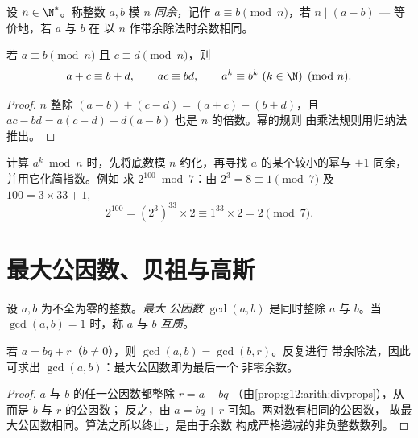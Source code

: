\begin{definition}[同余]\label{def:g12:arith:congruence}
设 $n \in \N^*$。称整数 $a, b$ 模
$n$ \emph{同余}，记作 $a \equiv b \pmod n$，若 $n \mid (a - b)$
--- 等价地，若 $a$ 与 $b$ 在
以 $n$ 作带余除法时余数相同。
\end{definition}

\begin{proposition}[运算的相容性]\label{prop:g12:arith:congops}
若 $a \equiv b \pmod n$ 且 $c \equiv d \pmod n$，则
\[
a + c \equiv b + d, \qquad
ac \equiv bd, \qquad
a^k \equiv b^k \ (k \in \N) \pmod n .
\]
\end{proposition}

\begin{proof}
$n$ 整除 $(a-b) + (c-d) = (a+c) - (b+d)$，且
$ac - bd = a(c - d) + d(a - b)$ 也是 $n$ 的倍数。幂的规则
由乘法规则用归纳法推出。
\end{proof}

\begin{method}[计算模 $n$ 的幂]\label{met:g12:arith:powers}
计算 $a^k \bmod n$ 时，先将底数模 $n$ 约化，再寻找
$a$ 的某个较小的幂与 $\pm1$ 同余，并用它化简指数。例如
求 $2^{100} \bmod 7$：由 $2^3 = 8 \equiv 1 \pmod 7$ 及
$100 = 3\times33 + 1$,
\[
2^{100} = \left(2^{3}\right)^{33} \times 2 \equiv 1^{33}\times 2 = 2 \pmod 7 .
\]
\end{method}

\section{最大公因数、贝祖与高斯}

\begin{definition}[最大公因数]\label{def:g12:arith:gcd}
设 $a, b$ 为不全为零的整数。\emph{最大
公因数} $\gcd(a, b)$ 是同时整除 $a$
与 $b$。当 $\gcd(a,b) = 1$ 时，称 $a$ 与 $b$
\emph{互质}。
\end{definition}

\begin{proposition}[欧几里得算法]\label{prop:g12:arith:euclidalgo}
若 $a = bq + r$（$b \neq 0$），则 $\gcd(a, b) = \gcd(b, r)$。反复进行
带余除法，因此可求出 $\gcd(a,b)$：最大公因数即为最后一个
非零余数。
\end{proposition}

\begin{proof}
$a$ 与 $b$ 的任一公因数都整除 $r = a - bq$
（由\cref{prop:g12:arith:divprops}），从而是 $b$ 与 $r$ 的公因数；
反之，由 $a = bq + r$ 可知。两对数有相同的公因数，
故最大公因数相同。算法之所以终止，是由于余数
构成严格递减的非负整数数列。
\end{proof}

